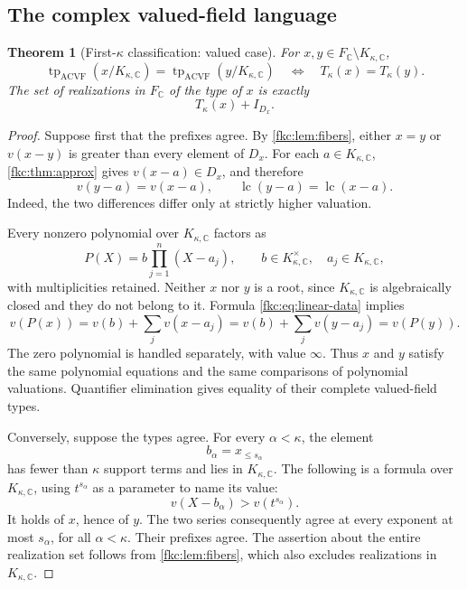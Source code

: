 \documentclass[11pt,letterpaper]{article}
\numberwithin{equation}{section}
\newtheorem{theorem}{Theorem}[section]
\theoremstyle{definition}
\theoremstyle{remark}
\newcommand{\C}{\mathbb C}
\newcommand{\tp}{\operatorname{tp}}
\newcommand{\lc}{\operatorname{lc}}
\newcommand{\ACVF}{\mathrm{ACVF}}
\newcommand{\KC}{K_{\kappa,\C}}
\newcommand{\FC}{F_{\C}}
\begin{document}
\subsection{The complex valued-field language}
\begin{theorem}[First-$\kappa$ classification: valued case]\label{fkc:thm:valued-type}
For $x,y\in\FC\setminus\KC$,
\begin{equation}\label{fkc:eq:valued-type}
 \tp_{\ACVF}(x/\KC)=\tp_{\ACVF}(y/\KC)
 \quad\Longleftrightarrow\quad T_\kappa(x)=T_\kappa(y).
\end{equation}
The set of realizations in $\FC$ of the type of $x$ is exactly
\[
 T_\kappa(x)+I_{D_x}.
\]
\end{theorem}
\begin{proof}
Suppose first that the prefixes agree. By \cref{fkc:lem:fibers}, either $x=y$ or $v(x-y)$ is greater than every element of $D_x$. For each $a\in\KC$, \cref{fkc:thm:approx} gives $v(x-a)\in D_x$, and therefore
\begin{equation}\label{fkc:eq:linear-data}
 v(y-a)=v(x-a),\qquad \lc(y-a)=\lc(x-a).
\end{equation}
Indeed, the two differences differ only at strictly higher valuation.

Every nonzero polynomial over $\KC$ factors as
\[
 P(X)=b\prod_{j=1}^{n}(X-a_j),\qquad b\in\KC^\times,\quad a_j\in\KC,
\]
with multiplicities retained. Neither $x$ nor $y$ is a root, since $\KC$ is algebraically closed and they do not belong to it. Formula \eqref{fkc:eq:linear-data} implies
\[
 v(P(x))=v(b)+\sum_j v(x-a_j)
         =v(b)+\sum_j v(y-a_j)=v(P(y)).
\]
The zero polynomial is handled separately, with value $\infty$. Thus $x$ and $y$ satisfy the same polynomial equations and the same comparisons of polynomial valuations. Quantifier elimination gives equality of their complete valued-field types.

Conversely, suppose the types agree. For every $\alpha<\kappa$, the element
\[
 b_\alpha=x_{\le s_\alpha}
\]
has fewer than $\kappa$ support terms and lies in $\KC$. The following is a formula over $\KC$, using $t^{s_\alpha}$ as a parameter to name its value:
\begin{equation}\label{fkc:eq:prefix-formula}
 v(X-b_\alpha)>v(t^{s_\alpha}).
\end{equation}
It holds of $x$, hence of $y$. The two series consequently agree at every exponent at most $s_\alpha$, for all $\alpha<\kappa$. Their prefixes agree. The assertion about the entire realization set follows from \cref{fkc:lem:fibers}, which also excludes realizations in $\KC$.
\end{proof}
\end{document}
